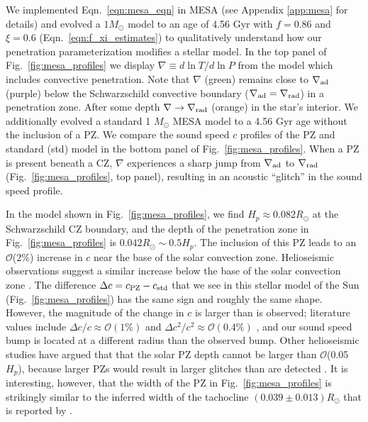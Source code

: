 \documentclass[twocolumn, linenumbers]{aastex631}
\newcommand{\gradrad}{\ensuremath{\nabla_{\rm{rad}}}}
\newcommand{\gradad}{\ensuremath{\nabla_{\rm{ad}}}}
\newcommand{\justgrad}{\ensuremath{\nabla}}
\begin{document}
We implemented Eqn.~\ref{eqn:mesa_eqn} in MESA (see Appendix \ref{app:mesa} for details) and evolved a $1 M_\odot$ model to an age of 4.56 Gyr with $f = 0.86$ and $\xi = 0.6$ (Eqn.~\ref{eqn:f_xi_estimates}) to qualitatively understand how our penetration parameterization modifies a stellar model.
In the top panel of Fig.~\ref{fig:mesa_profiles} we display $\justgrad \equiv d\ln T/d\ln P$ from the model which includes convective penetration.
Note that $\justgrad$ (green) remains close to $\gradad$ (purple) below the Schwarzschild convective boundary ($\gradad = \gradrad$) in a penetration zone.
After some depth $\justgrad \rightarrow \gradrad$ (orange) in the star's interior.
We additionally evolved a standard 1 $M_\odot$ MESA model to a 4.56 Gyr age without the inclusion of a PZ.
We compare the sound speed $c$ profiles of the PZ and standard (std) model in the bottom panel of Fig.~\ref{fig:mesa_profiles}.
When a PZ is present beneath a CZ, $\justgrad$ experiences a sharp jump from $\gradad$ to $\gradrad$ (Fig.~\ref{fig:mesa_profiles}, top panel), resulting in an acoustic ``glitch'' in the sound speed profile.

In the model shown in Fig.~\ref{fig:mesa_profiles}, we find $H_p \approx 0.082R_\odot$ at the Schwarzschild CZ boundary, and the depth of the penetration zone in Fig.~\ref{fig:mesa_profiles} is $0.042R_\odot \sim 0.5 H_p$.
The inclusion of this PZ leads to an $\mathcal{O}$(2\%) increase in $c$ near the base of the solar convection zone.
Helioseismic observations suggest a similar increase below the base of the solar convection zone \citep[e.g.,][their Fig. 17]{christensen-dalsgaard_etal_2011}.
The difference $\Delta c = c_{\rm{PZ}} - c_{\rm{std}}$ that we see in this stellar model of the Sun (Fig.~\ref{fig:mesa_profiles}) has the same sign and roughly the same shape.
However, the magnitude of the change in $c$ is larger than is observed; literature values include $\Delta c / c \approx \mathcal{O}(1\%)$ \citep{bergemann_serenelli_2014} and $\Delta c^2 / c^2 \approx \mathcal{O}(0.4\%)$ \citep{christensen-dalsgaard_etal_2011}, and our sound speed bump is located at a different radius than the observed bump.
Other helioseismic studies have argued that that the solar PZ depth cannot be larger than $\mathcal{O}$(0.05 $H_p$), because larger PZs would result in larger glitches than are detected  \citep[see Sct.~7.2.1 of][for a nice review]{basu2016}.
It is interesting, however, that the width of the PZ in Fig.~\ref{fig:mesa_profiles} is strikingly similar to the inferred width of the tachocline $(0.039 \pm 0.013)R_\odot$ that is reported by \citet{charbonneau_etal_1999}.
\end{document}
